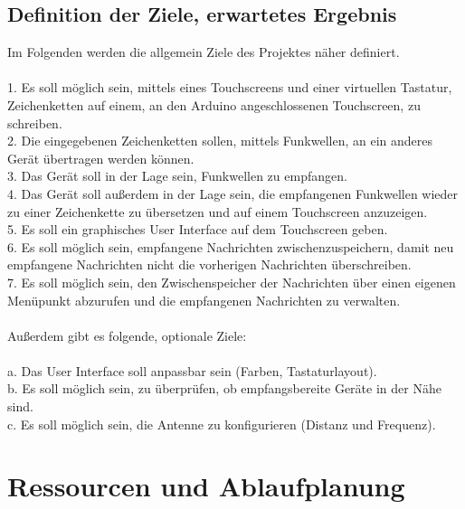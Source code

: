 \documentclass[a4paper, 11pt]{scrartcl}
\begin{document}
\subsection{Definition der Ziele, erwartetes Ergebnis}\label{ch:goals}
Im Folgenden werden die allgemein Ziele des Projektes näher definiert.
\\
\\
1. Es soll möglich sein, mittels eines Touchscreens und einer virtuellen Tastatur, Zeichenketten auf einem, an den Arduino angeschlossenen Touchscreen, zu schreiben.
\\
2. Die eingegebenen Zeichenketten sollen, mittels Funkwellen, an ein anderes Gerät übertragen werden können.
\\
3. Das Gerät soll in der Lage sein, Funkwellen zu empfangen.
\\
4. Das Gerät soll außerdem in der Lage sein, die empfangenen Funkwellen wieder zu einer Zeichenkette zu übersetzen und auf einem Touchscreen anzuzeigen.
\\
5. Es soll ein graphisches User Interface auf dem Touchscreen geben.
\\
6. Es soll möglich sein, empfangene Nachrichten zwischenzuspeichern, damit neu empfangene Nachrichten nicht die vorherigen Nachrichten überschreiben.
\\
7. Es soll möglich sein, den Zwischenspeicher der Nachrichten über einen eigenen Menüpunkt abzurufen und die empfangenen Nachrichten zu verwalten.
\\
\\
Außerdem gibt es folgende, optionale Ziele:
\\
\\
a. Das User Interface soll anpassbar sein (Farben, Tastaturlayout).
\\
b. Es soll möglich sein, zu überprüfen, ob empfangsbereite Geräte in der Nähe sind.
\\
c. Es soll möglich sein, die Antenne zu konfigurieren (Distanz und Frequenz).


\section{Ressourcen und Ablaufplanung}
\end{document}
